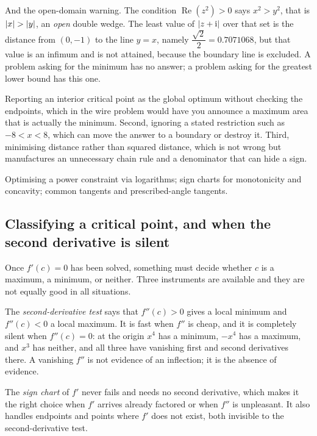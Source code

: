 \begin{worked}
And the open-domain warning. The condition $\operatorname{Re}(z^{2})>0$ says $x^{2}>y^{2}$, that is $\left\lvert x\right\rvert>\left\lvert y\right\rvert$, an \emph{open} double wedge. The least value of $\left\lvert z+\mathrm{i}\right\rvert$ over that set is the distance from $(0,-1)$ to the line $y=x$, namely $\dfrac{\sqrt2}{2}=0.7071068$, but that value is an infimum and is not attained, because the boundary line is excluded. A problem asking for the minimum has no answer; a problem asking for the greatest lower bound has this one.
\end{worked}

\begin{trap}
Reporting an interior critical point as the global optimum without checking the endpoints, which in the wire problem would have you announce a maximum area that is actually the minimum. Second, ignoring a stated restriction such as $-8<x<8$, which can move the answer to a boundary or destroy it. Third, minimising distance rather than squared distance, which is not wrong but manufactures an unnecessary chain rule and a denominator that can hide a sign.
\end{trap}

\begin{seealsob}Optimising a power constraint via logarithms; sign charts for monotonicity and concavity; common tangents and prescribed-angle tangents.\end{seealsob}

\subsection{Classifying a critical point, and when the second derivative is silent}

Once $f'(c)=0$ has been solved, something must decide whether $c$ is a maximum, a minimum, or neither. Three instruments are available and they are not equally good in all situations.

The \emph{second-derivative test} says that $f''(c)>0$ gives a local minimum and $f''(c)<0$ a local maximum. It is fast when $f''$ is cheap, and it is completely silent when $f''(c)=0$: at the origin $x^{4}$ has a minimum, $-x^{4}$ has a maximum, and $x^{3}$ has neither, and all three have vanishing first and second derivatives there. A vanishing $f''$ is not evidence of an inflection; it is the absence of evidence.

The \emph{sign chart} of $f'$ never fails and needs no second derivative, which makes it the right choice when $f'$ arrives already factored or when $f''$ is unpleasant. It also handles endpoints and points where $f'$ does not exist, both invisible to the second-derivative test.

